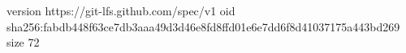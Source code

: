 version https://git-lfs.github.com/spec/v1
oid sha256:fabdb448f63ce7db3aaa49d3d46e8fd8ffd01e6e7dd6f8d41037175a443bd269
size 72
